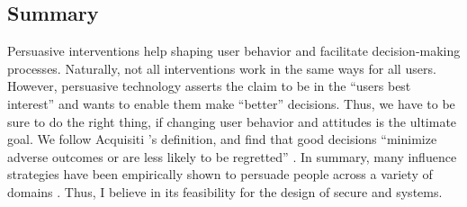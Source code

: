 	
	\subsection{Summary}
	Persuasive interventions help shaping user behavior and facilitate decision-making processes. Naturally, not all interventions work in the same ways for all users. However, persuasive technology asserts the claim to be in the ``users best interest'' and wants to enable them make ``better'' decisions. Thus, we have to be sure to do the right thing, if changing user behavior and attitudes is the ultimate goal. We follow Acquisiti \etal's definition, and find that good decisions ``minimize adverse outcomes or are less likely to be regretted'' \cite{Acquisti2017NudgesPrivacySecurity}. In summary, many influence strategies have been empirically shown to persuade people across a variety of domains \cite{Hamari2014DoPersuasiveTechnologies}. Thus, I believe in its feasibility for the design of secure and systems. 